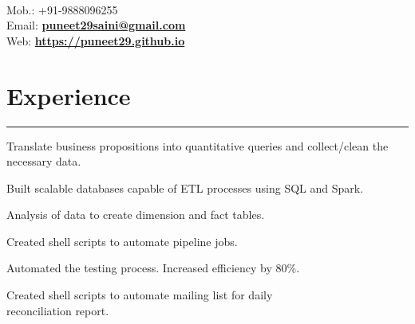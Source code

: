 \documentclass[]{puneet-resume}
\begin{document}
\hfill
\begin{minipage}[t]{0.66\textwidth}
\hspace*{0pt}\hfill    \\
\hspace*{0pt}\hfill Mob.: +91-9888096255 \\
\hspace*{0pt}\hfill Email: \textbf{\href{mailto:puneet29saini@gmail.com}{puneet29saini@gmail.com}} \\
\hspace*{0pt}\hfill Web: \textbf{\href{https://puneet29.github.io}{https://puneet29.github.io}} \\
\hspace*{0pt}\hfill {} \href{https://github.com/puneet29}{}  \href{https://www.linkedin.com/in/geekpuneet}{}
\section{Experience}
\noindent\rule{12.5cm}{0.4pt}
 
\noindent
\hspace{2.8em}%
\begin{minipage}{0.85\textwidth\vspace{0pt}}
\begin{tightemize}
	\item {}
	\begin{subtightemize}
		\item Translate business propositions into quantitative queries and collect/clean the necessary data.
		\item Built scalable databases capable of ETL processes using SQL and Spark.
		\item Analysis of data to create dimension and fact tables.
		\item Created shell scripts to automate pipeline jobs.
	\end{subtightemize}
	\item {}
	\begin{subtightemize}
		\item Automated the testing process. Increased efficiency by 80\%.
		\item Created shell scripts to automate mailing list for daily\\
		reconciliation report.
	\end{subtightemize}
\end{tightemize}
\end{minipage}
\sectionsep


\end{minipage}
\end{document}
